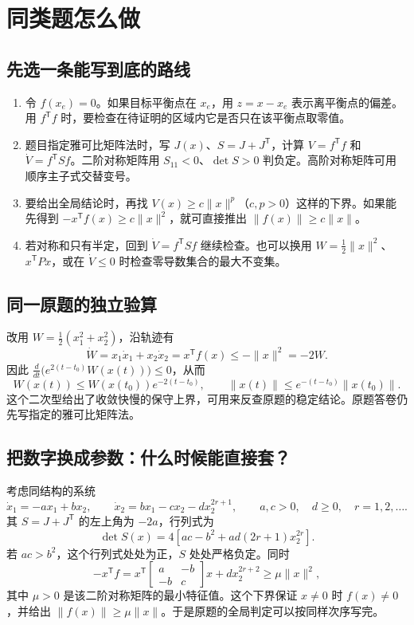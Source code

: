 \section{同类题怎么做}

\subsection{先选一条能写到底的路线}

\begin{enumerate}[leftmargin=*]
    \item 令 $f(x_e)=0$。如果目标平衡点在 $x_e$，用 $z=x-x_e$ 表示离平衡点的偏差。用 $f^{\mathsf T}f$ 时，要检查在待证明的区域内它是否只在该平衡点取零值。
    \item 题目指定雅可比矩阵法时，写 $J(x)$、$S=J+J^{\mathsf T}$，计算 $V=f^{\mathsf T}f$ 和 $\dot V=f^{\mathsf T}Sf$。二阶对称矩阵用 $S_{11}<0$、$\det S>0$ 判负定。高阶对称矩阵可用顺序主子式交替变号。
    \item 要给出全局结论时，再找 $V(x)\ge c\|x\|^p$（$c,p>0$）这样的下界。如果能先得到 $-x^{\mathsf T}f(x)\ge c\|x\|^2$，就可直接推出 $\|f(x)\|\ge c\|x\|$。
    \item 若对称和只有半定，回到 $\dot V=f^{\mathsf T}Sf$ 继续检查。也可以换用 $W=\tfrac12\|x\|^2$、$x^{\mathsf T}Px$，或在 $\dot V\le0$ 时检查零导数集合的最大不变集。
\end{enumerate}

\subsection{同一原题的独立验算}

改用 $W=\frac12(x_1^2+x_2^2)$，沿轨迹有
\[
    \dot W=x_1\dot x_1+x_2\dot x_2
          =x^{\mathsf T}f(x)
          \le -\|x\|^2=-2W .
\]
因此 $\frac{d}{dt}\bigl(e^{2(t-t_0)}W(x(t))\bigr)\le0$，从而
\[
    W(x(t))\le W(x(t_0))e^{-2(t-t_0)},\qquad
    \|x(t)\|\le e^{-(t-t_0)}\|x(t_0)\| .
\]
这个二次型给出了收敛快慢的保守上界，可用来反查原题的稳定结论。原题答卷仍先写指定的雅可比矩阵法。

\subsection{把数字换成参数：什么时候能直接套？}

考虑同结构的系统
\[
    \dot x_1=-ax_1+bx_2,\qquad
    \dot x_2=bx_1-cx_2-dx_2^{2r+1},
    \qquad a,c>0,\quad d\ge0,\quad r=1,2,\ldots .
\]
其 $S=J+J^{\mathsf T}$ 的左上角为 $-2a$，行列式为
\[
    \det S(x)=4\left[ac-b^2+ad(2r+1)x_2^{2r}\right].
\]
若 $ac>b^2$，这个行列式处处为正，$S$ 处处严格负定。同时
\[
     -x^{\mathsf T}f=x^{\mathsf T}
      \begin{bmatrix}a&-b\\-b&c\end{bmatrix}x
      +d x_2^{2r+2}\ge \mu\|x\|^2 ,
\]
其中 $\mu>0$ 是该二阶对称矩阵的最小特征值。这个下界保证 $x\ne0$ 时 $f(x)\ne0$，并给出 $\|f(x)\|\ge\mu\|x\|$。于是原题的全局判定可以按同样次序写完。

